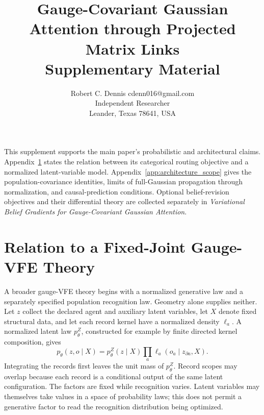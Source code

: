 \documentclass[twoside,11pt]{article}
\begin{document}

\title{Gauge-Covariant Gaussian Attention through Projected Matrix Links\\[6pt]
\large Supplementary Material}

\author{\name Robert C. Dennis \email cdenn016@gmail.com \\
  \addr Independent Researcher\\
  \addr Leander, Texas 78641, USA}


\maketitle


This supplement supports the main paper's probabilistic and architectural claims. Appendix~\ref{app:fixed_joint_bridge} states the relation between its categorical routing objective and a normalized latent-variable model. Appendix~\ref{app:architecture_scope} gives the population-covariance identities, limits of full-Gaussian propagation through normalization, and causal-prediction conditions. Optional belief-revision objectives and their differential theory are collected separately in \emph{Variational Belief Gradients for Gauge-Covariant Gaussian Attention}.

\appendix
\renewcommand{\theequation}{S\arabic{equation}}
\renewcommand{\thefigure}{S\arabic{figure}}
\renewcommand{\thetable}{S\arabic{table}}

\section{Relation to a Fixed-Joint Gauge-VFE Theory}
\label{app:fixed_joint_bridge}

A broader gauge-VFE theory begins with a normalized generative law and a separately specified population recognition law. Geometry alone supplies neither. Let $z$ collect the declared agent and auxiliary latent variables, let $X$ denote fixed structural data, and let each record kernel have a normalized density $\ell_a$. A normalized latent law $p_\theta^Z$, constructed for example by finite directed kernel composition, gives
\begin{equation}
p_\theta(z,o\mid X)=p_\theta^Z(z\mid X)\prod_a\ell_a(o_a\mid z_{\partial a},X).
\label{eq:rg_bridge_joint}
\end{equation}
Integrating the records first leaves the unit mass of $p_\theta^Z$. Record scopes may overlap because each record is a conditional output of the same latent configuration. The factors are fixed while recognition varies. Latent variables may themselves take values in a space of probability laws; this does not permit a generative factor to read the recognition distribution being optimized.
\end{document}
